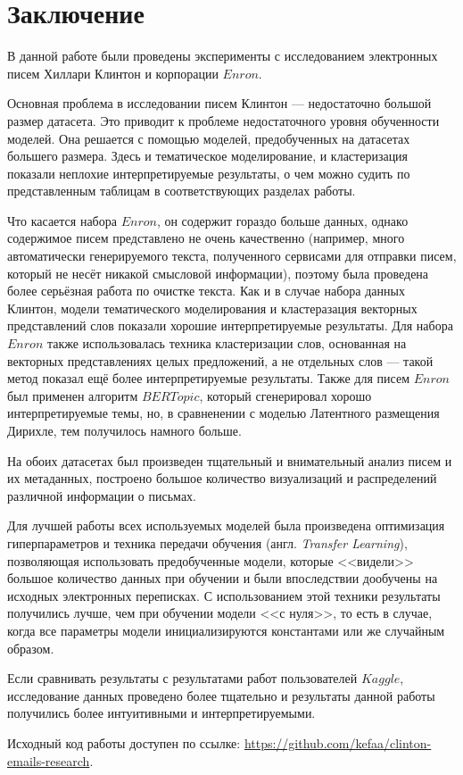 \chapter*{Заключение}

В данной работе были проведены эксперименты с исследованием электронных писем Хиллари Клинтон и корпорации $Enron$. 

Основная проблема в исследовании писем Клинтон --- недостаточно большой размер датасета. Это приводит к проблеме недостаточного уровня обученности моделей. Она решается с помощью 
моделей, предобученных на датасетах большего размера. Здесь и тематическое моделирование, и кластеризация показали неплохие интерпретируемые результаты, о чем можно судить по представленным таблицам в соответствующих разделах работы.

Что касается набора $Enron$, он содержит гораздо больше данных, однако содержимое писем представлено не очень качественно (например, много автоматически генерируемого текста, полученного сервисами
для отправки писем, который не несёт никакой смысловой информации), поэтому была проведена более серьёзная работа по очистке текста. Как и в случае
набора данных Клинтон, модели тематического моделирования и кластеразация векторных 
представлений слов показали хорошие интерпретируемые результаты. Для набора $Enron$ также использовалась техника кластеризации слов, основанная на векторных представлениях целых предложений, а не отдельных слов --- такой метод показал ещё более интерпретируемые результаты. Также для писем $Enron$ был применен алгоритм $BERTopic$, который сгенерировал хорошо интерпретируемые темы, но, в сравненении с моделью Латентного размещения Дирихле, тем получилось намного больше.

На обоих датасетах был произведен тщательный и внимательный анализ писем и их метаданных, построено большое количество визуализаций и распределений различной информации о письмах.

Для лучшей работы всех используемых моделей была произведена оптимизация гиперпараметров и техника передачи обучения (англ. \textit{Transfer Learning}), позволяющая использовать предобученные модели, которые <<видели>> большое количество данных при обучении и были впоследствии дообучены на исходных электронных переписках. С использованием этой техники результаты получились лучше, чем при обучении модели <<с нуля>>, то есть в случае, когда все параметры модели инициализируются константами или же случайным образом.

Если сравнивать результаты с результатами работ пользователей $Kaggle$, исследование данных проведено более тщательно и результаты данной работы получились более интуитивными и интерпретируемыми.

Исходный код работы доступен по ссылке: \url{https://github.com/kefaa/clinton-emails-research}.

\clearpage
